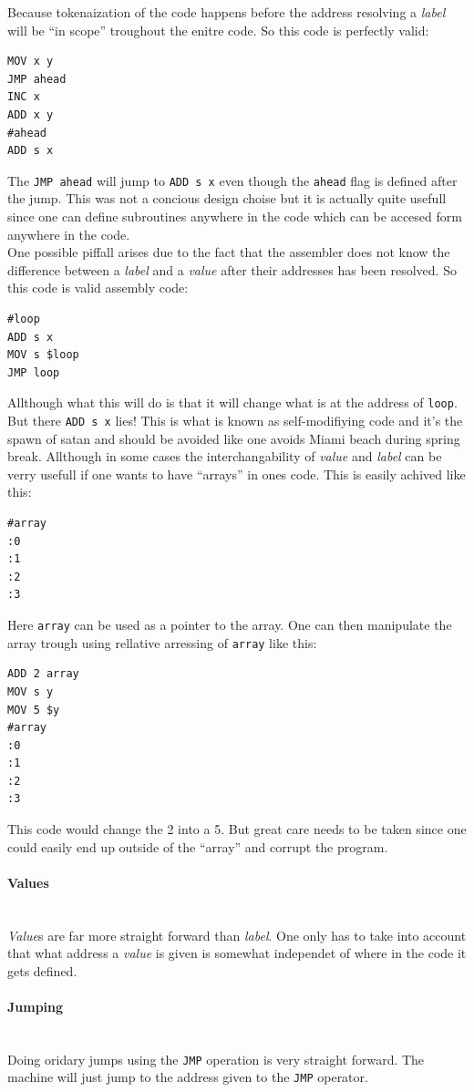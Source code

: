 \documentclass{article}
\newcommand{\V}{\verb}
\begin{document}
Because tokenaization of the code happens before the address resolving a \emph{label}
will be ``in scope'' troughout the enitre code. So this code is perfectly valid:

\begin{verbatim}
MOV x y
JMP ahead
INC x
ADD x y
#ahead
ADD s x
\end{verbatim}
The \V+JMP ahead+ will jump to \V+ADD s x+ even though the \V+ahead+ flag is
defined after the jump. This was not a concious design choise but it is actually
quite usefull since one can define subroutines anywhere in the code which can be
accesed form anywhere in the code.\\
One possible piffall arises due to the fact that the assembler does not know the
difference between a \emph{label} and a \emph{value} after their addresses has been resolved.
So this code is valid assembly code:
\begin{verbatim}
#loop
ADD s x
MOV s $loop
JMP loop
\end{verbatim}
Allthough what this will do is that it will change what is at the address of
\V+loop+. But there \V+ADD s x+ lies! This is what is known as self-modifiying
code and it's the spawn of satan and should be avoided like one avoids Miami
beach during spring break. Allthough in some cases the interchangability of
\emph{value} and \emph{label} can be verry usefull if one wants to have ``arrays'' in ones
code. This is easily achived like this:
\begin{verbatim}
#array
:0
:1
:2
:3
\end{verbatim}
Here \V+array+ can be used as a pointer to the array. One can then manipulate
the array trough using rellative arressing of \V+array+ like this:
\begin{verbatim}
ADD 2 array
MOV s y
MOV 5 $y
#array
:0
:1
:2
:3
\end{verbatim}
This code would change the 2 into a 5. But great care needs to be taken since
one could easily end up outside of the ``array'' and corrupt the program.

\paragraph{Values} \ 
\\
\emph{Value}s are far more straight forward than \emph{label}. One only has to
take into account that what address a \emph{value} is given is somewhat
independet of where in the code it gets defined.

\paragraph{Jumping} \
\\
Doing oridary jumps using the \V+JMP+ operation is very straight forward. The
machine will just jump to the address given to the \V+JMP+ operator.
\end{document}
